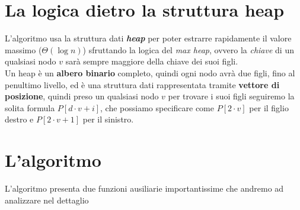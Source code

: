 \documentclass{article}
\begin{document}
\section*{La logica dietro la struttura heap}
L'algoritmo usa la struttura dati \textbf{\textit{heap}} per poter estrarre rapidamente
il valore massimo ($\Theta(\log n)$) sfruttando la logica del \textit{max heap},
ovvero la \textit{chiave} di un qualsiasi nodo $v$ sarà sempre maggiore della chiave dei suoi figli. \\
Un heap è un \textbf{albero binario} completo, quindi ogni nodo avrà due figli, fino al 
penultimo livello, ed è una struttura dati rappresentata tramite \textbf{vettore di posizione},
quindi preso un qualsiasi nodo $v$ per trovare i suoi figli seguiremo la solita formula 
$P[d \cdot v + i]$, che possiamo specificare come $P[2 \cdot v]$ per il figlio destro e 
$P[2 \cdot v + 1]$ per il sinistro. 

\section*{L'algoritmo}

\vspace{0.3cm}
\begin{algorithm}[H]
%

\caption{heapsort}
\end{algorithm}
\vspace{0.3cm}

L'algoritmo presenta due funzioni ausiliarie importantissime che andremo ad analizzare 
nel dettaglio

\vspace{0.3cm}
\begin{algorithm}[H]
%

\caption{buildMaxHeap}
\end{algorithm}
\vspace{0.3cm}
\end{document}

